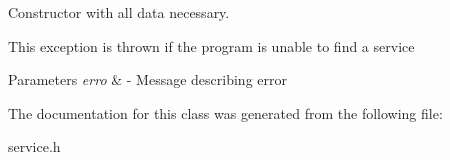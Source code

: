 Constructor with all data necessary. 

This exception is thrown if the program is unable to find a service


\begin{DoxyParams}{Parameters}
{\em erro} & -\/ Message describing error \\
\hline
\end{DoxyParams}


The documentation for this class was generated from the following file\+:\begin{DoxyCompactItemize}
\item 
service.\+h\end{DoxyCompactItemize}
